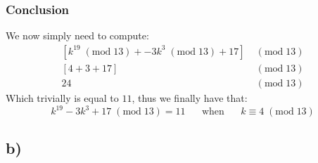 \documentclass{article}
\begin{document}
\subsubsection*{Conclusion}
We now simply need to compute: $$\begin{aligned}
    \left[ k^{19} \; (\text{mod}\; 13)+ -3k^{3}\;(\text{mod}\; 13)+17 \right] \; &(\text{mod}\; 13)\\
    \left[ 4+3+17 \right]\;&(\text{mod}\; 13)\\
    24\;&(\text{mod}\; 13)  
\end{aligned}$$
Which trivially is equal to $11$, thus we finally have that: $$k^{19}-3k^{3}+17 \;(\text{mod}\; 13)=11\;\;\;\;\;\;\text{when}\;\;\;\;\;\;k \equiv 4\; (\text{mod}\; 13)$$
\subsection*{b)}
\end{document}
